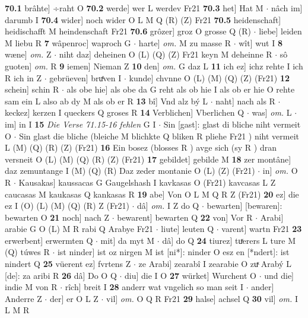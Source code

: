 \documentclass[8pt,a4paper,notitlepage]{article}
\begin{document}
\begin{table}[ht]
\begin{minipage}[t]{0.5\linewidth}
\textbf{70.1} brâhte] ÷raht O \textbf{70.2} werde] wer L werdev Fr21 \textbf{70.3} het] Hat M  $\cdot$ nâch im] darumb I \textbf{70.4} wider] noch wider O L M Q (R) (Z) Fr21 \textbf{70.5} heidenschaft] heidischafft M heindenschaft Fr21 \textbf{70.6} grôzer] groz O grosse Q (R)  $\cdot$ liebe] leiden M liebu R \textbf{7} wâpenroc] waproch G  $\cdot$ harte] \textit{om.} M zu masse R  $\cdot$ wît] wut I \textbf{8} wæne] \textit{om.} Z  $\cdot$ niht daz] deheinen O (L) (Q) (Z) Fr21 keyn M deheinne R  $\cdot$ sô guoten] \textit{om.} R \textbf{9} iemen] Nieman Z \textbf{10} den] \textit{om.} G daz L \textbf{11} ich ez] ichz rehte I ich R ich in Z  $\cdot$ gebrüeven] bruͤven I  $\cdot$ kunde] chvnne O (L) (M) (Q) (Z) (Fr21) \textbf{12} schein] schin R  $\cdot$ als obe hie] als obe da G reht als ob hie I als ob er hie O rehte sam ein L also ab dy M als ob er R \textbf{13} bî] Vnd alz bý L  $\cdot$ naht] nach als R  $\cdot$ keckez] kerzen I queckers Q groses R \textbf{14} Verblichen] Vberlichen Q  $\cdot$ was] \textit{om.} L  $\cdot$ im] in I \textbf{15} \textit{Die Verse 71.15-16 fehlen} G I   $\cdot$ Sin [gast]: glast di bliche niht vermeit O  $\cdot$ Sin glast die bliche (bleiche M blichkte Q bliken R pliehe Fr21 ) niht vermeit L (M) (Q) (R) (Z) (Fr21) \textbf{16} Ein bosez (blosses R ) avge sich (sy R ) dran versneit O (L) (M) (Q) (R) (Z) (Fr21) \textbf{17} gebildet] gebilde M \textbf{18} zer montâne] daz zemuntange I (M) (Q) (R) Daz zeder montanie O (L) (Z) (Fr21)  $\cdot$ in] \textit{om.} O R  $\cdot$ Kausakas] kaussacas G Gaugelshash I kavkasas O (Fr21) kavcasas L Z caucasas M kaukasas Q kankasas R \textbf{19} abe] Von O L M Q R Z (Fr21) \textbf{20} ez] die ez I (O) (L) (M) (Q) (R) Z (Fr21)  $\cdot$ dâ] \textit{om.} I Z do Q  $\cdot$ bewarten] [bewaren]: bewarten O \textbf{21} noch] nach Z  $\cdot$ bewarent] bewarten Q \textbf{22} von] Vor R  $\cdot$ Arabi] arabie G O (L) M R rabi Q Arabye Fr21  $\cdot$ liute] leuten Q  $\cdot$ varent] wartn Fr21 \textbf{23} erwerbent] erwermten Q  $\cdot$ mit] da myt M  $\cdot$ dâ] do Q \textbf{24} tiurez] tuͯerers L ture M (Q) túwes R  $\cdot$ ist ninder] ist oz nirgen M ist [ni*]: ninder O esz en [*ndert]: ist nindert Q \textbf{25} vüerent ez] fvrtens Z  $\cdot$ ze Arabi] zearabî I zearabie O zuͯ Arabý L [de]: za aribi R \textbf{26} dâ] Do O Q  $\cdot$ diu] die I O \textbf{27} würket] Wurchent O  $\cdot$ und die] indie M von R  $\cdot$ rîch] breit I \textbf{28} anderr wat vngelich so man seit I  $\cdot$ ander] Anderre Z  $\cdot$ der] er O L Z  $\cdot$ vil] \textit{om.} O Q R Fr21 \textbf{29} halse] achsel Q \textbf{30} vil] \textit{om.} I L M R \newline

\end{minipage}
\end{table}
\end{document}
